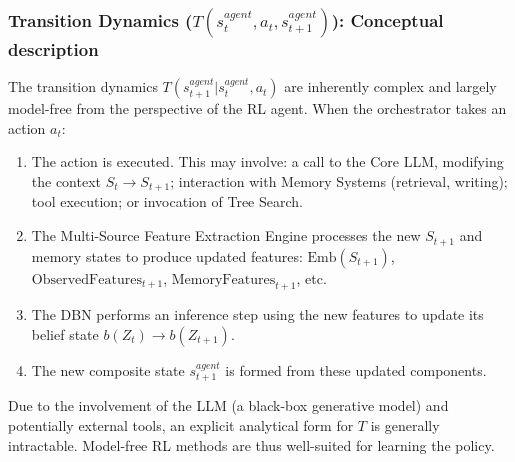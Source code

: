 \documentclass[11pt]{article}
\begin{document}
\subsubsection{Transition Dynamics ($T(s_t^{agent}, a_t, s_{t+1}^{agent})$): Conceptual description}
\label{sssec:mdp_transitions}
The transition dynamics $T(s_{t+1}^{agent} | s_t^{agent}, a_t)$ are inherently complex and largely model-free from the perspective of the RL agent. When the orchestrator takes an action $a_t$:
\begin{enumerate}
    \item The action is executed. This may involve: a call to the Core LLM, modifying the context $S_t \rightarrow S_{t+1}$; interaction with Memory Systems (retrieval, writing); tool execution; or invocation of Tree Search.
    \item The Multi-Source Feature Extraction Engine processes the new $S_{t+1}$ and memory states to produce updated features: $\text{Emb}(S_{t+1})$, $\text{ObservedFeatures}_{t+1}$, $\text{MemoryFeatures}_{t+1}$, etc.
    \item The DBN performs an inference step using the new features to update its belief state $b(Z_t) \rightarrow b(Z_{t+1})$.
    \item The new composite state $s_{t+1}^{agent}$ is formed from these updated components.
\end{enumerate}
Due to the involvement of the LLM (a black-box generative model) and potentially external tools, an explicit analytical form for $T$ is generally intractable. Model-free RL methods are thus well-suited for learning the policy.
\end{document}
